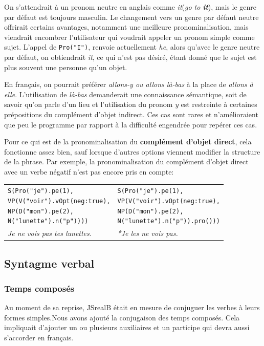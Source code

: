 \documentclass[11pt]{article} %
\newcommand{\system}[1]{\textsf{#1}}
\newcommand{\JSB}{\system{JSrealB}}
\newcommand{\real}[1]{\emph{#1}}
\begin{document}
On s'attendrait à un pronom\emph{
}neutre en anglais comme \emph{it}(\emph{go to \textbf{it}}), mais le genre par défaut est toujours
masculin. Le changement vers un genre par défaut neutre offrirait certains avantages, 
notamment une meilleure pronominalisation, mais viendrait encombrer l'utilisateur
qui voudrait appeler un pronom simple comme sujet. L'appel de \texttt{Pro("I")}, renvoie 
actuellement \emph{he}, alors qu'avec le genre neutre par défaut, on obtiendrait \emph{it},
ce qui n'est pas désiré, étant donné que le sujet est plus souvent une personne qu'un objet.

En français, on pourrait préférer \emph{allons-y ou allons
là-bas} à la place de \emph{allons à elle}. L'utilisation de \emph{là-bas} demanderait une connaissance sémantique,
soit de savoir qu'on parle d'un lieu et l'utilisation du pronom \emph{y}
est restreinte à certaines prépositions du complément d'objet indirect.
Ces cas sont rares et n'amélioraient que peu le programme par rapport à la difficulté
engendrée pour repérer ces cas. 

Pour ce qui est de la pronominalisation du \textbf{complément d'objet
direct}, cela fonctionne assez bien, sauf lorsque d'autres options viennent
modifier la structure de la phrase. Par exemple, la pronominalisation du complément
d'objet direct avec un verbe négatif n'est pas encore pris en compte:\\
\begin{tabular}{p{8cm} p{8cm}}
\begin{alltt}
S(Pro("je").pe(1),
  VP(V("voir").vOpt({neg:true}),
     NP(D("mon").pe(2),
        N("lunette").n("p"))))
\end{alltt} &
\begin{alltt}
S(Pro("je").pe(1),
  VP(V("voir").vOpt({neg:true}),
     NP(D("mon").pe(2),
        N("lunette").n("p")).pro()))
\end{alltt} \\
\real{Je ne vois pas tes lunettes.} & \real{*Je les ne vois pas.}
\end{tabular}
\subsection{Syntagme verbal}

\subsubsection{Temps composés}

Au moment de sa reprise, \JSB{} était en mesure de conjuguer les
verbes à leurs formes simples.Nous avons ajouté la conjugaison des temps composés.
Cela impliquait d'ajouter un ou plusieurs auxiliaires et un participe qui devra
aussi s'accorder en français.
\end{document}
